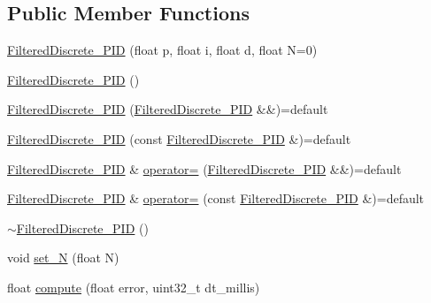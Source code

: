 \subsection*{Public Member Functions}
\begin{DoxyCompactItemize}
\item 
\mbox{\hyperlink{class_filtered_discrete___p_i_d_a9cc44afe9d0209b34c760a2512a6d290}{Filtered\+Discrete\+\_\+\+P\+ID}} (float p, float i, float d, float N=0)
\item 
\mbox{\hyperlink{class_filtered_discrete___p_i_d_aaee4ac4ba8f81e22a4fbc68843e4cb79}{Filtered\+Discrete\+\_\+\+P\+ID}} ()
\item 
\mbox{\hyperlink{class_filtered_discrete___p_i_d_a6158e91cc05d56a14f5f2fdc73ede339}{Filtered\+Discrete\+\_\+\+P\+ID}} (\mbox{\hyperlink{class_filtered_discrete___p_i_d}{Filtered\+Discrete\+\_\+\+P\+ID}} \&\&)=default
\item 
\mbox{\hyperlink{class_filtered_discrete___p_i_d_aad43f3393dfc04f64fd920cacc39e3ba}{Filtered\+Discrete\+\_\+\+P\+ID}} (const \mbox{\hyperlink{class_filtered_discrete___p_i_d}{Filtered\+Discrete\+\_\+\+P\+ID}} \&)=default
\item 
\mbox{\hyperlink{class_filtered_discrete___p_i_d}{Filtered\+Discrete\+\_\+\+P\+ID}} \& \mbox{\hyperlink{class_filtered_discrete___p_i_d_a25527ee5cdf564098de13dd362d475fc}{operator=}} (\mbox{\hyperlink{class_filtered_discrete___p_i_d}{Filtered\+Discrete\+\_\+\+P\+ID}} \&\&)=default
\item 
\mbox{\hyperlink{class_filtered_discrete___p_i_d}{Filtered\+Discrete\+\_\+\+P\+ID}} \& \mbox{\hyperlink{class_filtered_discrete___p_i_d_a55b65570940f6524c32777818895724b}{operator=}} (const \mbox{\hyperlink{class_filtered_discrete___p_i_d}{Filtered\+Discrete\+\_\+\+P\+ID}} \&)=default
\item 
\mbox{\hyperlink{class_filtered_discrete___p_i_d_a5ce4abb18462ab922dc4180eb1b1dedc}{$\sim$\+Filtered\+Discrete\+\_\+\+P\+ID}} ()
\item 
void \mbox{\hyperlink{class_filtered_discrete___p_i_d_a65d51421738b55322736c62cc91dcbb5}{set\+\_\+N}} (float N)
\item 
float \mbox{\hyperlink{class_filtered_discrete___p_i_d_abbfc49fd3eb46f14f02ef707412193e3}{compute}} (float error, uint32\+\_\+t dt\+\_\+millis)
\end{DoxyCompactItemize}
